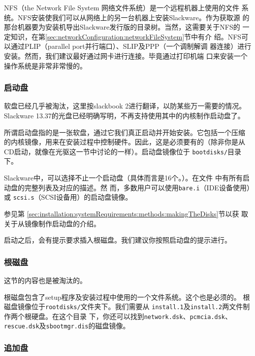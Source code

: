 NFS（the Network File System 网络文件系统）是一个远程机器上使用的文件
系统。NFS安装使我们可以从网络上的另一台机器上安装Slackware。作为获取源
的那台机器要为安装机导出Slackware发行版的目录树。当然，这需要关于NFS的
一定知识，在第\ref{sec:networkConfiguration:networkFileSystem}节中有介
绍。NFS可以通过PLIP（parallel port并行端口）、SLIP及PPP（一个调制解调
器连接）进行安装。然而，我们建议最好通过网卡进行连接。毕竟通过打印机端
口来安装一个操作系统是非常非常慢的。

\subsubsection{启动盘}
\label{sec:installation:systemRequirements:methods:bootDisk}

软盘已经几乎被淘汰，这里按slackbook 2进行翻译，以防某些万一需要的情况。
Slackware 13.37的光盘已经明确写明，不再支持使用其中的内核制作启动盘了。

所谓启动盘指的是一张软盘，通过它我们真正启动并开始安装。它包括一个压缩
的内核镜像，用来在安装过程中控制硬件。因此，这是必须要有的（除非你是从
CD启动，就像在光驱这一节中讨论的一样）。启动盘镜像位于
\texttt{bootdisks/}目录下。

Slackware中，可以选择不止一个启动盘（具体而言是16个。）。在文件
中有所有启动盘的完整列表及对应的描述。然
而，多数用户可以使用\texttt{bare.i}（IDE设备使用）或
\texttt{scsi.s}（SCSI设备用）的启动盘镜像。

参见第
\ref{sec:installation:systemRequirements:methods:makingTheDisks}节以获
取关于从镜像制作启动盘的介绍。

启动之后，会有提示要求插入根磁盘。我们建议你按照启动盘的提示进行。
\subsubsection{根磁盘}
\label{sec:installation:systemRequirements:methods:rootDisk}

这节的内容也是被淘汰的。

根磁盘包含了setup程序及安装过程中使用的一个文件系统。这个也是必须的。
根磁盘镜像位于\texttt{rootdisks/}文件夹下。我们需要从
\texttt{install.1}及\texttt{install.2}两文件制作两个根硬盘。在这个目录
下，你还可以找到\texttt{network.dsk}、\texttt{pcmcia.dsk}、
\texttt{rescue.dsk}及\texttt{sbootmgr.dis}的磁盘镜像。

\subsubsection{追加盘}
\label{sec:installation:systemRequirements:methods:supplementalDisk}

